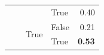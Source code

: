 \begin{tabular}{@{}llllr@{}}
                                                                        &                                   &                           & True                      & 0.40 \\
                                                                        &                                   & \multirow[c]{2}{*}{True}  & False                     & 0.21 \\
                                                                        &                                   &                           & True                      & \textbf{0.53} \\
   \bottomrule
\end{tabular}
